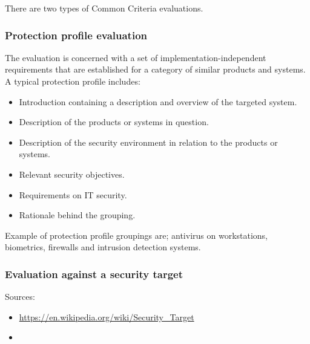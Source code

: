 \documentclass[10pt]{article}
\begin{document}
      There are two types of Common Criteria evaluations.

      \subsubsection{Protection profile evaluation}

        The evaluation is concerned with a set of implementation-independent
        requirements that are established for a category of similar products
        and systems. A typical protection profile includes:
        \begin{itemize}
          \item{Introduction containing a description and overview of the
            targeted system.}
          \item{Description of the products or systems in question.}
          \item{Description of the security environment in relation to the
            products or systems.}
          \item{Relevant security objectives.}
          \item{Requirements on IT security.}
          \item{Rationale behind the grouping.}
        \end{itemize}
        Example of protection profile groupings are; antivirus on workstations,
        biometrics, firewalls and intrusion detection systems.

      \subsubsection{Evaluation against a security target}
      Sources:
      \begin{itemize}
        \item{\url{https://en.wikipedia.org/wiki/Security_Target}}
        \item{}
      \end{itemize}
\end{document}
